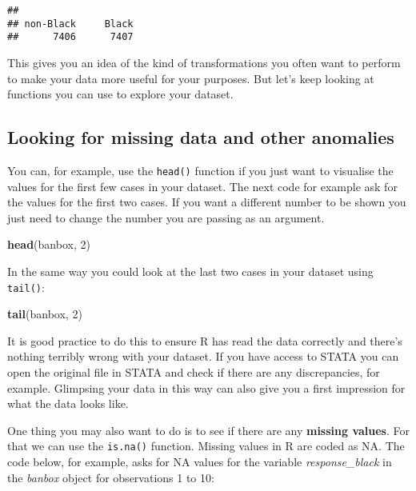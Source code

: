 \documentclass[
]{book}
\newenvironment{Shaded}{\begin{snugshade}}{\end{snugshade}}
\newcommand{\DecValTok}[1]{\textcolor[rgb]{0.00,0.00,0.81}{#1}}
\newcommand{\FunctionTok}[1]{\textcolor[rgb]{0.13,0.29,0.53}{\textbf{#1}}}
\newcommand{\NormalTok}[1]{#1}
\begin{document}
\begin{verbatim}
## 
## non-Black     Black 
##      7406      7407
\end{verbatim}

This gives you an idea of the kind of transformations you often want to perform to make your data more useful for your purposes. But let's keep looking at functions you can use to explore your dataset.

\subsection{Looking for missing data and other anomalies}\label{looking-for-missing-data-and-other-anomalies}

You can, for example, use the \texttt{head()} function if you just want to visualise the values for the first few cases in your dataset. The next code for example ask for the values for the first two cases. If you want a different number to be shown you just need to change the number you are passing as an argument.

\begin{Shaded}
\begin{Highlighting}[]
\FunctionTok{head}\NormalTok{(banbox, }\DecValTok{2}\NormalTok{)}
\end{Highlighting}
\end{Shaded}

In the same way you could look at the last two cases in your dataset using \texttt{tail()}:

\begin{Shaded}
\begin{Highlighting}[]
\FunctionTok{tail}\NormalTok{(banbox, }\DecValTok{2}\NormalTok{)}
\end{Highlighting}
\end{Shaded}

It is good practice to do this to ensure R has read the data correctly and there's nothing terribly wrong with your dataset. If you have access to STATA you can open the original file in STATA and check if there are any discrepancies, for example. Glimpsing your data in this way can also give you a first impression for what the data looks like.

One thing you may also want to do is to see if there are any \textbf{missing values}. For that we can use the \texttt{is.na()} function. Missing values in R are coded as NA. The code below, for example, asks for NA values for the variable \emph{response\_black} in the \emph{banbox} object for observations 1 to 10:
\end{document}
